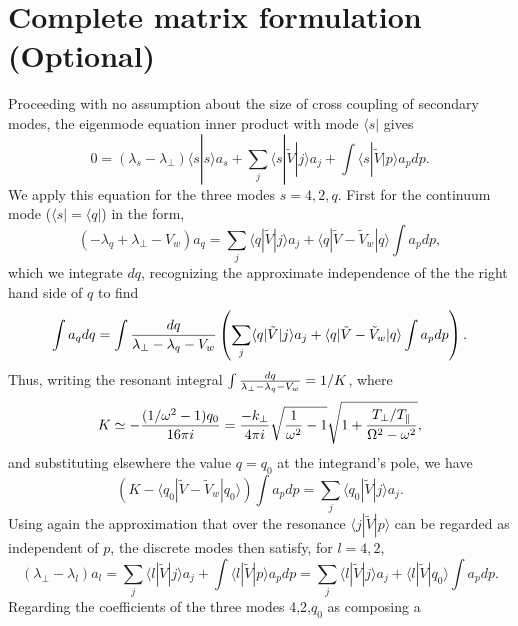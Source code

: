 \documentclass[12pt]{article}
\def\ket#1{|#1\rangle}
\def\bra#1{\langle#1}
\begin{document}
\section{Complete matrix formulation (Optional)}

Proceeding with no assumption about the size of cross coupling of secondary
modes, the eigenmode equation inner product with mode $\bra{s}|$ gives
\begin{equation}
  \label{eigengen}
  0=(\lambda_s-\lambda_\perp)\bra{s}\ket{s}a_s+\sum_j\bra{s}|\tilde{V}\ket{j}a_j
+\int\bra{s}|\tilde{V}\ket{p}a_pdp.
\end{equation}
We apply this equation for the three modes $s=4,2,q$. First for the
continuum mode ($\bra{s}|=\bra{q}|$) in the form,
\begin{equation}
  \label{eigq}
  (-\lambda_q+\lambda_\perp-V_w)a_q=\sum_j\bra{q}|\tilde{V}\ket{j}a_j
+\bra{q}|\tilde V-\tilde V_w\ket{q}\int a_pdp,
\end{equation}
which we integrate $dq$, recognizing the approximate independence of
the the right hand side of $q$ to find
\begin{equation}
  \label{eigqint}
  \int a_q dq =\int {dq\over \lambda_\perp-\lambda_q-V_w}
  \left(\sum_j\bra{q}|\tilde{V}\ket{j}a_j
+\bra{q}|\tilde V-\tilde V_w\ket{q}\int a_pdp \right).
\end{equation}
Thus, writing the resonant integral
$\int {dq\over \lambda_\perp-\lambda_q-V_w}=1/K$, where
\begin{equation}
  \label{Kdef}
  K\simeq-{(1/\omega^2-1)q_0\over16\pi i}
  ={-k_\perp\over4\pi i}\sqrt{{1\over\omega^2}-1}
\sqrt{1+{T_\perp/T_\parallel\over\Omega^2-\omega^2}},  
\end{equation}
and substituting elsewhere the
value $q=q_0$ at the integrand's pole, we have
\begin{equation}
  \label{eigqint2}
  (K-\bra{q_0}|\tilde V-\tilde V_w\ket{q_0})\int a_pdp = \sum_j\bra{q_0}|\tilde{V}\ket{j}a_j.
\end{equation}
Using again the approximation that over the resonance
$\bra{j}|\tilde V\ket{p}$ can be regarded as independent of $p$, the
discrete modes then satisfy, for $l=4,2$,
\begin{equation}
  \label{eigenl}
  (\lambda_\perp-\lambda_l)a_l=\sum_j\bra{l}|\tilde{V}\ket{j}a_j
  +\int\bra{l}|\tilde{V}\ket{p}a_pdp
  =\sum_j\bra{l}|\tilde{V}\ket{j}a_j
  +\bra{l}|\tilde{V}\ket{q_0}\int a_pdp.
\end{equation}
Regarding the coefficients of the three modes 4,2,$q_0$ as composing a
\end{document}
